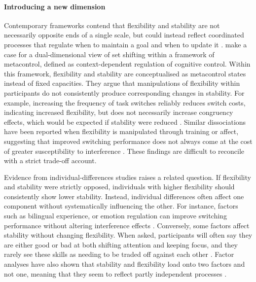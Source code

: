 \documentclass[12pt,a4paper]{report}
\begin{document}
\paragraph{Introducing a new dimension} Contemporary frameworks contend that flexibility and stability are not necessarily opposite ends of a single scale, but could instead reflect coordinated processes that regulate when to maintain a goal and when to update it \parencite{egner2023principles, nack2023metacognition}. \textcite{nack2023metacognition} make a case for a dual-dimensional view of set shifting within a framework of metacontrol, defined as context-dependent regulation of cognitive control. Within this framework, flexibility and stability are conceptualised as metacontrol states instead of fixed capacities. They argue that manipulations of flexibility within participants do not consistently produce corresponding changes in stability. For example, increasing the frequency of task switches reliably reduces switch costs, indicating increased flexibility, but does not necessarily increase congruency effects, which would be expected if stability were reduced \parencite{geddert2022tradeoff}. Similar dissociations have been reported when flexibility is manipulated through training or affect, suggesting that improved switching performance does not always come at the cost of greater susceptibility to interference \parencite{zhao2020switchtraining,sali2021flexibleattention}. These findings are difficult to reconcile with a strict trade-off account.

Evidence from individual-differences studies raises a related question. If flexibility and stability were strictly opposed, individuals with higher flexibility should consistently show lower stability. Instead, individual differences often affect one component without systematically influencing the other. For instance, factors such as bilingual experience, or emotion regulation can improve switching performance without altering interference effects \parencite{christoeffels2015bilingualflexible, mcrae2012reappraisalcontrol}. Conversely, some factors affect stability without changing flexibility. When asked, participants will often say they are either good or bad at both shifting attention and keeping focus, and they rarely see these skills as needing to be traded off against each other \parencite{derryberry2002anxiouscontrol}. Factor analyses have also shown that stability and flexibility load onto two factors and not one, meaning that they seem to reflect partly independent processes \parencite{bejjani2022latentswitch, chiorri2017factoranalysis}.
\end{document}
